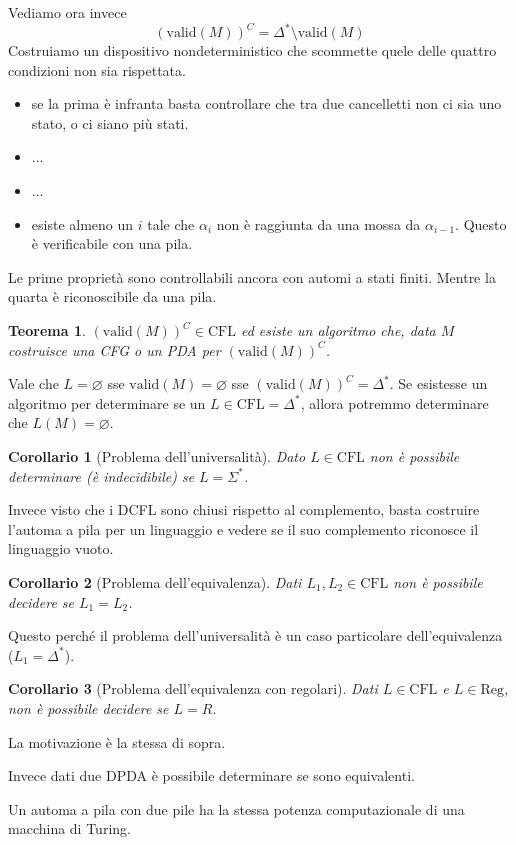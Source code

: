 \documentclass[12pt]{report}
\newtheorem{teorema}{Teorema}
\newtheorem{corollario}{Corollario}
\theoremstyle{definition}
\begin{document}
Vediamo ora invece
$$ ( \text{valid}(M) )^C = \Delta^* \setminus \text{valid}(M) $$
Costruiamo un dispositivo nondeterministico che scommette quele delle quattro condizioni non sia rispettata.
\begin{itemize}
	\item se la prima è infranta basta controllare che tra due cancelletti non ci sia uno stato, o ci siano più stati.
	\item ...
	\item ...
	\item esiste almeno un $i$ tale che $\alpha_i$ non è raggiunta da una mossa da $\alpha_{i - 1}$.
		Questo è verificabile con una pila.
\end{itemize}
Le prime proprietà sono controllabili ancora con automi a stati finiti.
Mentre la quarta è riconoscibile da una pila.
\begin{teorema}
	$(\text{valid}(M))^C \in \text{CFL}$ ed esiste un algoritmo che, data $M$ costruisce una CFG o un PDA per $(\text{valid}(M))^C$.
\end{teorema}
Vale che $L = \varnothing$ sse $\text{valid}(M) = \varnothing$ sse $(\text{valid}(M))^C = \Delta^*$.
Se esistesse un algoritmo per determinare se un $L \in \text{CFL} = \Delta^*$, allora potremmo determinare che $L(M) = \varnothing$.
\begin{corollario}[Problema dell'universalità]
	Dato $L \in \text{CFL}$ non è possibile determinare (è indecidibile) se $L = \Sigma^*$.
\end{corollario}
Invece visto che i DCFL sono chiusi rispetto al complemento, basta costruire l'automa a pila per un linguaggio e vedere se il suo complemento riconosce il linguaggio vuoto.
\begin{corollario}[Problema dell'equivalenza]
	Dati $L_1, L_2 \in \text{CFL}$ non è possibile decidere se $L_1 = L_2$.
\end{corollario}
Questo perché il problema dell'universalità è un caso particolare dell'equivalenza ($L_1 = \Delta^*$).

\begin{corollario}[Problema dell'equivalenza con regolari]
	Dati $L \in \text{CFL}$ e $L \in \text{Reg}$, non è possibile decidere se $L = R$.
\end{corollario}
La motivazione è la stessa di sopra.

Invece dati due DPDA è possibile determinare se sono equivalenti.

Un automa a pila con due pile ha la stessa potenza computazionale di una macchina di Turing.
\end{document}
